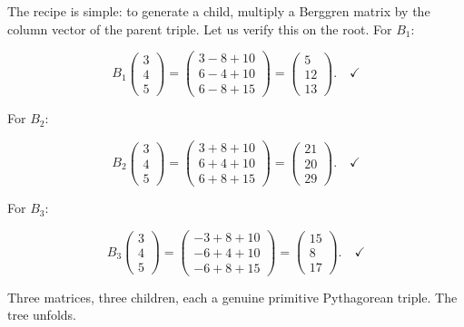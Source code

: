 \documentclass[11pt,openright,twoside]{book}
\theoremstyle{definition}
\begin{document}
The recipe is simple: to generate a child, multiply a Berggren matrix by the column vector of the parent triple. Let us verify this on the root. For $B_1$:

\[B_1 \begin{pmatrix} 3 \\ 4 \\ 5 \end{pmatrix} = \begin{pmatrix} 3 - 8 + 10 \\ 6 - 4 + 10 \\ 6 - 8 + 15 \end{pmatrix} = \begin{pmatrix} 5 \\ 12 \\ 13 \end{pmatrix}. \quad \checkmark\]

For $B_2$:

\[B_2 \begin{pmatrix} 3 \\ 4 \\ 5 \end{pmatrix} = \begin{pmatrix} 3 + 8 + 10 \\ 6 + 4 + 10 \\ 6 + 8 + 15 \end{pmatrix} = \begin{pmatrix} 21 \\ 20 \\ 29 \end{pmatrix}. \quad \checkmark\]

For $B_3$:

\[B_3 \begin{pmatrix} 3 \\ 4 \\ 5 \end{pmatrix} = \begin{pmatrix} -3 + 8 + 10 \\ -6 + 4 + 10 \\ -6 + 8 + 15 \end{pmatrix} = \begin{pmatrix} 15 \\ 8 \\ 17 \end{pmatrix}. \quad \checkmark\]

Three matrices, three children, each a genuine primitive Pythagorean triple. The tree unfolds.
\end{document}
